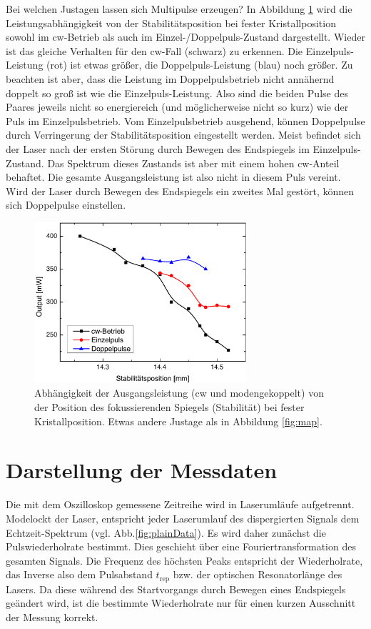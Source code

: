 \documentclass[bachelor,       %
               twoside,        %
               BCOR10mm,       %
               liststotoc,nomtotoc,bibtotoc, %
               english,ngerman, %
               final,          %
               ]{GAUBM}
\begin{document}
Bei welchen Justagen lassen sich Multipulse erzeugen?
In Abbildung \ref{fig:map2} wird die Leistungsabhängigkeit von der Stabilitätsposition bei fester Kristallposition sowohl im cw-Betrieb als auch im Einzel-/Doppelpuls-Zustand  dargestellt.
Wieder ist das gleiche Verhalten für den cw-Fall (schwarz) zu erkennen.
Die Einzelpuls-Leistung (rot) ist etwas größer, die Doppelpuls-Leistung (blau) noch größer.
Zu beachten ist aber, dass die Leistung im Doppelpulsbetrieb nicht annähernd doppelt so groß ist wie die Einzelpuls-Leistung.
Also sind die beiden Pulse des Paares jeweils nicht so energiereich (und möglicherweise nicht so kurz) wie der Puls im Einzelpulsbetrieb.
Vom Einzelpulsbetrieb ausgehend, können Doppelpulse durch Verringerung der Stabilitätsposition eingestellt werden.
Meist befindet sich der Laser nach der ersten Störung durch Bewegen des Endspiegels  im Einzelpuls-Zustand.
Das Spektrum dieses Zustands ist aber mit einem hohen cw-Anteil behaftet.
Die gesamte Ausgangsleistung ist also nicht in diesem Puls vereint.
Wird der Laser durch Bewegen des Endspiegels ein zweites Mal gestört, können sich Doppelpulse einstellen.

\begin{figure}[!htb]
	\centering
	\includegraphics[width=0.7\textwidth]{figures/map2.pdf}
	\caption{Abhängigkeit der Ausgangsleistung (cw und modengekoppelt) von der Position des fokussierenden Spiegels (Stabilität) bei fester Kristallposition.
	Etwas andere Justage als in Abbildung \ref{fig:map}.}
	\label{fig:map2}
\end{figure}


\section{Darstellung der Messdaten}
Die mit dem Oszilloskop  gemessene Zeitreihe wird in Laserumläufe aufgetrennt.
Modelockt der Laser, entspricht jeder Laserumlauf des dispergierten Signals dem Echtzeit-Spektrum (vgl. Abb.\ref{fig:plainData}).
Es wird daher zunächst die Pulswiederholrate bestimmt.
Dies geschieht über eine Fouriertransformation des gesamten Signals.
Die Frequenz des höchsten Peaks entspricht der Wiederholrate, das Inverse also dem Pulsabstand $t_\text{rep}$ bzw. der optischen Resonatorlänge des Lasers.
Da diese während des Startvorgangs durch Bewegen eines Endspiegels geändert wird, ist die bestimmte Wiederholrate nur für einen kurzen Ausschnitt der Messung korrekt.
\end{document}

